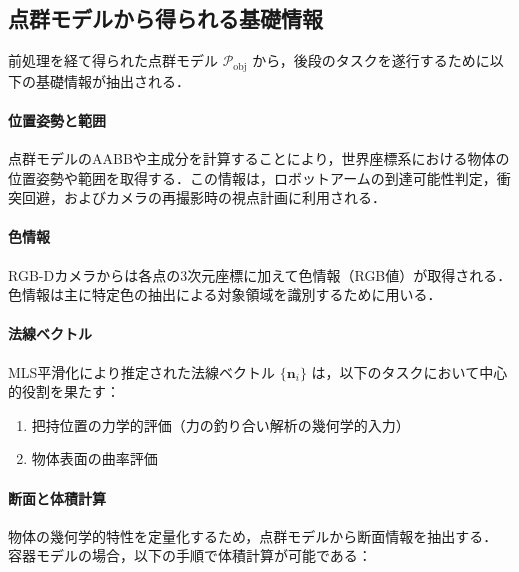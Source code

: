 \subsection{点群モデルから得られる基礎情報}
\label{sec:system:pointcloud:basic-information}
前処理を経て得られた点群モデル $\mathcal{P}_{\mathrm{obj}}$ から，後段のタスクを遂行するために以下の基礎情報が抽出される．

\paragraph{位置姿勢と範囲}

点群モデルのAABBや主成分を計算することにより，世界座標系における物体の位置姿勢や範囲を取得する．この情報は，ロボットアームの到達可能性判定，衝突回避，およびカメラの再撮影時の視点計画に利用される．

\paragraph{色情報}

RGB-Dカメラからは各点の3次元座標に加えて色情報（RGB値）が取得される．
色情報は主に特定色の抽出による対象領域を識別するために用いる．

\paragraph{法線ベクトル}

MLS平滑化により推定された法線ベクトル $\{ \bm{n}_i \}$ は，以下のタスクにおいて中心的役割を果たす：

\begin{enumerate}
  \item 把持位置の力学的評価（力の釣り合い解析の幾何学的入力）
  \item 物体表面の曲率評価
\end{enumerate}


\paragraph{断面と体積計算}

物体の幾何学的特性を定量化するため，点群モデルから断面情報を抽出する．
容器モデルの場合，以下の手順で体積計算が可能である：

